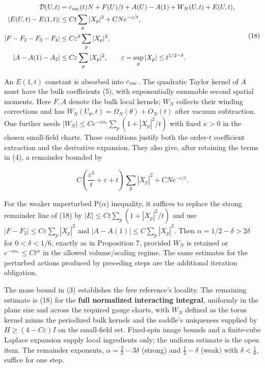 \documentclass[11pt,a4paper]{article}
\begin{document}
\[\begin{aligned}
\mathcal D(U,t)&=c_{\rm vac}(t)N+F(U)/t+A(U)-A(1)+W_N(U,t)+E(U,t),\\
|E(U,t)-E(1,t)|&\le C t\sum_p|X_p|^2+CNe^{-c/t},\\
|F-F_2-F_3-F_4|&\le C\varepsilon^3\sum_p|X_p|^2,\\
|A-A(1)-A_2|&\le C\varepsilon\sum_p|X_p|^2,
\qquad \varepsilon=\sup_p|X_p|\le t^{1/2-\delta}.
\end{aligned}\tag{18}\]

An \(E(1,t)\) constant is absorbed into \(c_{\rm vac}\). The quadratic
Taylor kernel of \(A\) must have the bulk coefficients (5), with
exponentially summable second spatial moments. Here \(F,A\) denote the
bulk local kernels; \(W_N\) collects their winding corrections and has
\(W_N(U_\theta,t)=\Omega_N(\theta)+O_N(t)\) after vacuum subtraction.
One further needs \(|W_N|\le C e^{-\kappa n_*}\sum_p(1+|X_p|^2/t)\) with
fixed \(\kappa>0\) in the chosen small-field charts. These conditions
justify both the order-\(t\) coefficient extraction and the derivative
expansion. They also give, after retaining the terms in (4), a remainder
bounded by

\[C\left(\frac{\varepsilon^3}{t}+\varepsilon+t\right)
\sum_p|X_p|^2+CNe^{-c/t}.\]

For the weaker unperturbed P(\(\alpha\)) inequality, it suffices to
replace the strong remainder line of (18) by
\(|E|\le Ct\sum_p(1+|X_p|^2/t)\) and use
\(|F-F_2|\le C\varepsilon\sum_p|X_p|^2\) and
\(|A-A(1)|\le C\sum_p|X_p|^2\). Then \(\alpha=1/2-\delta>2\delta\) for
\(0<\delta<1/6\), exactly as in Proposition 7, provided \(W_N\) is
retained or \(e^{-\kappa n_*}\le Ct^\alpha\) in the allowed
volume/scaling regime. The same estimates for the perturbed actions
produced by preceding steps are the additional iteration obligation.

The mass bound in (3) establishes the free reference's locality. The
remaining estimate is (18) for the \textbf{full normalized interacting
integral}, uniformly in the plane size and across the required gauge
charts, with \(W_N\) defined as the torus kernel minus the periodized
bulk kernels and the saddle's uniqueness supplied by
\(H\ge(4-C\varepsilon)I\) on the small-field set. Fixed-spin image
bounds and a finite-cube Laplace expansion supply local ingredients
only; the uniform estimate is the open item. The remainder exponents,
\(\alpha=\frac32-3\delta\) (strong) and \(\frac12-\delta\) (weak) with
\(\delta<\frac16\), suffice for one step.
\end{document}
